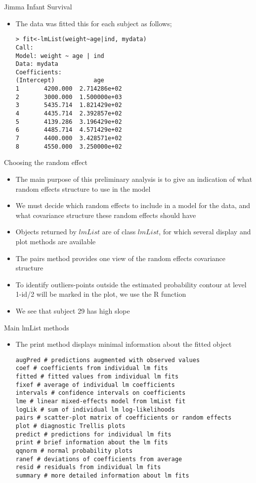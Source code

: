 \documentclass{beamer}
\begin{document}
\begin{frame}[fragile]{Jimma Infant Survival}
\begin{itemize}
\item The data was fitted this for each subject as follows;
\begin{verbatim}
> fit<-lmList(weight~age|ind, mydata)
Call:
Model: weight ~ age | ind 
Data: mydata 
Coefficients:
(Intercept)           age
1       4200.000  2.714286e+02
2       3000.000  1.500000e+03
3       5435.714  1.821429e+02
4       4435.714  2.392857e+02
5       4139.286  3.196429e+02
6       4485.714  4.571429e+02
7       4400.000  3.428571e+02
8       4550.000  3.250000e+02
\end{verbatim}
\end{itemize}
\end{frame}

\begin{frame}{Choosing the random effect}
\begin{itemize}
\item The main purpose of this preliminary analysis is to give an indication of what random effects structure to use in the model
\item We must decide which random effects to include in a model for the data, and what covariance structure these random effects should have 
\item Objects returned by $lmList$ are of class $lmList$, for which several display
and plot methods are available
\item The pairs method provides one view of the random effects covariance structure
\item To identify outliers-points outside the estimated probability contour at level 1-id/2 will be marked in the plot, we use the R function 
\item We see that subject 29 has high slope
\end{itemize}
\end{frame}

\begin{frame}[fragile]{Main lmList methods}
\begin{itemize}
\item The print method displays minimal information about the fitted object
\begin{verbatim}
augPred # predictions augmented with observed values
coef # coefficients from individual lm fits
fitted # fitted values from individual lm fits
fixef # average of individual lm coefficients
intervals # confidence intervals on coefficients
lme # linear mixed-effects model from lmList fit
logLik # sum of individual lm log-likelihoods
pairs # scatter-plot matrix of coefficients or random effects
plot # diagnostic Trellis plots
predict # predictions for individual lm fits
print # brief information about the lm fits
qqnorm # normal probability plots
ranef # deviations of coefficients from average
resid # residuals from individual lm fits
summary # more detailed information about lm fits
\end{verbatim}
\end{itemize}
\end{frame}
\end{document}
